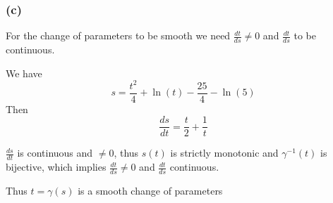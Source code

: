 \documentclass{article}
\begin{document}
\subsubsection*{(c)}
For the change of parameters to be smooth we need \(\frac{dt}{ds} \neq 0\) and \(\frac{dt}{ds}\) to 
be continuous.

We have
\[
s = \frac{t^2}{4} + \ln(t) - \frac{25}{4} - \ln(5)
\]
Then
\[
\frac{ds}{dt} = \frac{t}{2} + \frac{1}{t}
\]

\(\frac{ds}{dt}\) is continuous and \(\neq 0\), thus \(s(t)\) is strictly monotonic and \(\gamma^{-1}(t)\) is bijective, 
which implies \(\frac{dt}{ds} \neq 0\) and \(\frac{dt}{ds}\) continuous. 

Thus \(t = \gamma(s)\) is a smooth change of parameters
\end{document}

